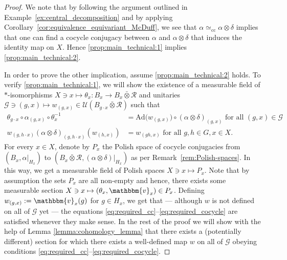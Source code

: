 \documentclass[11pt,a4paper]{article}
\theoremstyle{definition}
\theoremstyle{remark}
\numberwithin{equation}{section}
\numberwithin{theorem}{section}
\begin{document}
\begin{proof}
We note that by following the argument outlined in Example~\ref{ex:central_decomposition} and by applying Corollary~\ref{cor:equivalence_equivariant_McDuff}, we see that $\alpha \simeq_{\mathrm{cc}} \alpha \otimes \delta$ implies that one can find a cocycle conjugacy between $\alpha$ and $\alpha\otimes\delta$ that induces the identity map on $X$.
Hence \ref{prop:main_technical:1} implies \ref{prop:main_technical:2}.

In order to prove the other implication, assume \ref{prop:main_technical:2} holds. 
To verify \ref{prop:main_technical:1}, we will show the existence of a measurable field of $*$-isomorphisms ${X \ni x \mapsto \theta_x \colon B_x \rightarrow B_x \bar{\otimes} \mathcal{R}}$ and unitaries ${\mathcal{G} \ni (g,x) \mapsto w_{(g,x)} \in \mathcal{U}(B_{g \cdot x} \bar{\otimes} \mathcal{R})}$ such that
\begin{align}
\theta_{g \cdot x} \circ \alpha_{(g,x)} \circ \theta_{x}^{-1} &= \mathrm{Ad} \big( w_{(g,x)} \big) \circ (\alpha \otimes \delta)_{(g,x)} \text{ for all } (g,x) \in \mathcal{G}\label{eq:required_cc}\\
  w_{(g,h \cdot x)} (\alpha \otimes \delta)_{(g,h \cdot x)}(w_{(h,x)}) &= w_{(gh,x)} \text{ for all } g,h \in G, x \in X.\label{eq:required_cocycle}
\end{align}
%
For every $x \in X$, denote by $P_x$ the Polish space of cocycle conjugacies from $(B_x, \alpha|_{H_x})$ to $(B_x \bar{\otimes} \mathcal{R}, (\alpha \otimes \delta)|_{H_x})$ as per Remark~\ref{rem:Polish-spaces}. 
In this way, we get a measurable field of Polish spaces $X \ni x \mapsto P_x$. Note that by assumption the sets $P_x$ are all non-empty and hence, there exists some measurable section 
$ X \ni x \mapsto (\theta_x, \mathbbm{v}_x) \in P_x$.
Defining $w_{(g,x)} := \mathbbm{v}_{x}(g)$ for $g \in H_x$, we get that --- although $w$ is not defined on all of $\mathcal{G}$ yet --- the equations \eqref{eq:required_cc}--\eqref{eq:required_cocycle} are satisfied whenever they make sense.
In the rest of the proof we will show with the help of Lemma \ref{lemma:cohomology_lemma} that there exists a (potentially different) section for which there exists a well-defined map $w$ on all of $\mathcal{G}$ obeying conditions \eqref{eq:required_cc}--\eqref{eq:required_cocycle}.


\end{proof}
\end{document}
